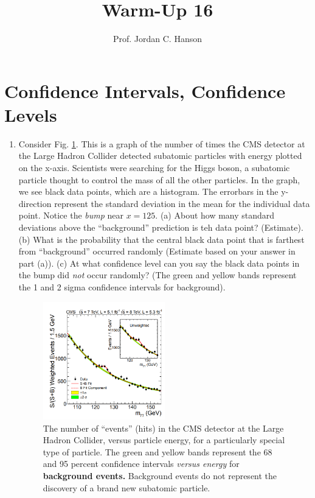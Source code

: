 \documentclass{article}
\begin{document}
\title{Warm-Up 16}
\author{Prof. Jordan C. Hanson}

\maketitle

\section{Confidence Intervals, Confidence Levels}

\begin{enumerate}
\item Consider Fig. \ref{fig:higgs}.  This is a graph of the number of times the CMS detector at the Large Hadron Collider detected subatomic particles with energy plotted on the x-axis.  Scientists were searching for the Higgs boson, a subatomic particle thought to control the mass of all the other particles.  In the graph, we see black data points, which are a histogram.  The errorbars in the y-direction represent the standard deviation in the mean for the individual data point.  Notice the \textit{bump} near $x = 125$.  (a) About how many standard deviations above the ``background'' prediction is teh data point? (Estimate). (b) What is the probability that the central black data point that is farthest from ``background'' occurred randomly (Estimate based on your answer in part (a)). (c) At what confidence level can you say the black data points in the bump did \textit{not} occur randomly?  (The green and yellow bands represent the 1 and 2 sigma confidence intervals for background).
\begin{figure}[ht]
\centering
\includegraphics[width=0.5\textwidth]{higgs.png}
\caption{\label{fig:higgs} The number of ``events'' (hits) in the CMS detector at the Large Hadron Collider, versus particle energy, for a particularly special type of particle.  The green and yellow bands represent the 68 and 95 percent confidence intervals \textit{versus energy} for \textbf{background events.}  Background events do not represent the discovery of a brand new subatomic particle.}
\end{figure}
\end{enumerate}
\end{document}
